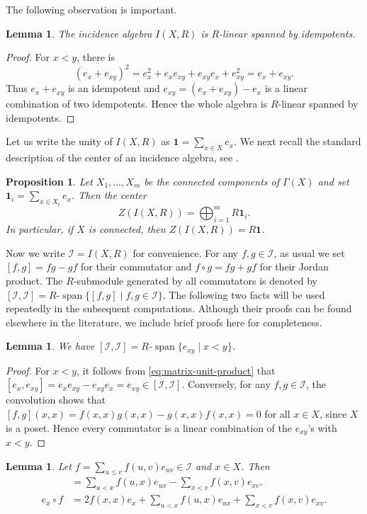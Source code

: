 \documentclass[reqno]{amsart}
\numberwithin{equation}{section}
\theoremstyle{plain}
\newtheorem{lemma}[theorem]{Lemma}
\newtheorem{proposition}[theorem]{Proposition}
\theoremstyle{definition}
\newcommand{\I}{\mathcal I}
\newcommand{\one}{\mathbf 1}
\newcommand{\Span}{\operatorname{span}}
\begin{document}
The following observation is important.

\begin{lemma}\label{lem:idempotent-span}
The incidence algebra $I(X,R)$ is $R$-linear spanned by idempotents.
\end{lemma}

\begin{proof}
For $x<y$, there is
\[
(e_x+e_{xy})^2
=e_x^2+e_xe_{xy}+e_{xy}e_x+e_{xy}^2
=e_x+e_{xy}.
\]
Thus $e_x+e_{xy}$ is an idempotent and
$e_{xy}=(e_x+e_{xy})-e_x$ is a linear combination of two
idempotents. Hence the whole algebra is $R$-linear spanned by idempotents.
\end{proof}

Let us write the unity of $I(X,R)$ as
$\one=\sum_{x\in X}e_x$. We next recall the standard description of the center of an
incidence algebra, see \cite[Corollary 1.3.14]{SpDo}.

\begin{proposition}\label{prop:center}
Let $X_1,\ldots,X_m$ be the connected components of
$\Gamma(X)$ and set $\one_i=\sum_{x\in X_i}e_x$.
Then the center
\[
Z(I(X,R))=\bigoplus_{i=1}^m R\one_i.
\]
In particular, if $X$ is connected, then $Z(I(X,R))=R\one$.
\end{proposition}

Now we write $\I=I(X,R)$ for convenience. For any $f,g\in\I$, as usual we set $[f,g]=fg-gf$ for their commutator and
$f\circ g=fg+gf$ for their Jordan product. The $R$-submodule
generated by all commutators is denoted by
$[\I,\I]=R$-$\Span\{[f,g]\mid f,g\in\I\}$.
The following two facts will be used repeatedly in the
subsequent computations. Although their proofs can be found
elsewhere in the literature, we include brief proofs here for completeness.

\begin{lemma}\label{lem:commutator-submodule}
We have
$[\I,\I]=R$-$\Span\{e_{xy}\mid x<y\}$.
\end{lemma}

\begin{proof}
For $x<y$, it follows from \eqref{eq:matrix-unit-product} that
$[e_x,e_{xy}]=e_xe_{xy}-e_{xy}e_x=e_{xy}\in [\I,\I]$.
Conversely, for any $f,g\in\I$, the convolution shows that
$[f,g](x,x)=f(x,x)g(x,x)-g(x,x)f(x,x)=0$ for all $x\in X$, since $X$ is a poset.
Hence every commutator is a linear combination of the
$e_{xy}$'s with $x<y$.
\end{proof}

\begin{lemma}\label{lem:coefficient-formulas}
Let $f=\sum_{u\leq v}f(u,v)e_{uv}\in\I$ and $x\in X$.  Then
\begin{align}
[f,e_x]&=\sum_{u<x}f(u,x)e_{ux}
-\sum_{x<v}f(x,v)e_{xv},
\label{eq:comm-ex}\\
e_x\circ f&=2f(x,x)e_x
+\sum_{u<x}f(u,x)e_{ux}
+\sum_{x<v}f(x,v)e_{xv}.
\label{eq:jordan-ex}
\end{align}
\end{lemma}
\end{document}
